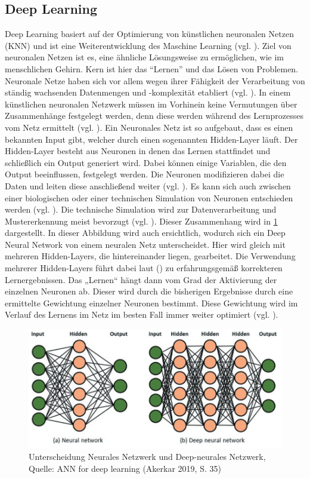 \subsection{Deep Learning}
Deep Learning basiert auf der Optimierung von künstlichen neuronalen Netzen (KNN) und ist eine Weiterentwicklung des Maschine Learning (vgl. \cite[S. 1]{Georgevici.2019}). Ziel von neuronalen Netzen ist es, eine ähnliche Lösungsweise zu ermöglichen, wie im menschlichen Gehirn. Kern ist hier das “Lernen” und das Lösen von Problemen. Neuronale Netze haben sich vor allem wegen ihrer Fähigkeit der Verarbeitung von ständig wachsenden Datenmengen und -komplexität etabliert (vgl. \cite[S. 373]{Welsch.2018}). In einem künstlichen neuronalen Netzwerk müssen im Vorhinein keine Vermutungen über Zusammenhänge festgelegt werden, denn diese werden während des Lernprozesses vom Netz ermittelt (vgl. \cite[S. 581]{Backhaus.2018b}). Ein Neuronales Netz ist 
so aufgebaut, dass es einen bekannten Input gibt, welcher durch einen sogenannten Hidden-Layer läuft. Der Hidden-Layer besteht aus Neuronen in denen das Lernen stattfindet und schließlich ein Output generiert wird. Dabei können einige Variablen, die den Output beeinflussen, festgelegt werden. 
Die Neuronen modifizieren dabei die Daten und leiten diese anschließend weiter (vgl. \cite[S. 373]{Welsch.2018}). Es kann sich auch zwischen einer biologischen oder einer technischen Simulation von Neuronen entschieden werden (vgl. \cite{https:www.facebook.comspektrumverlag.04.12.2014}). Die technische Simulation wird zur Datenverarbeitung und Mustererkennung meist bevorzugt (vgl. \cite{https:www.facebook.comspektrumverlag.04.12.2014}). Dieser Zusammenhang wird in \ref{fig:NeuralVsDeepNeural} dargestellt. 
In dieser Abbildung wird auch ersichtlich, wodurch sich ein Deep Neural Network von einem neuralen Netz unterscheidet. Hier wird gleich mit mehreren Hidden-Layers, die hintereinander liegen, gearbeitet. Die Verwendung mehrerer Hidden-Layers führt dabei laut (\cite[S. 581]{Backhaus.2018b}) zu erfahrungsgemäß korrekteren Lernergebnissen. Das „Lernen“ hängt dann vom Grad der Aktivierung der einzelnen Neuronen ab. Dieser wird durch die bisherigen Ergebnisse durch eine ermittelte Gewichtung einzelner Neuronen bestimmt. Diese Gewichtung wird im Verlauf des Lernens im Netz im besten Fall immer weiter optimiert (vgl. \cite[S. 586]{Backhaus.2018b}).
\begin{figure}[ht]
\centering
\includegraphics[width=\linewidth]{pics/ANN_for_deep_learning_P35}
\caption{Unterscheidung Neurales Netzwerk und Deep-neurales Netzwerk, Quelle: ANN for deep learning (Akerkar 2019, S. 35)}
\label{fig:NeuralVsDeepNeural}
\end{figure}
